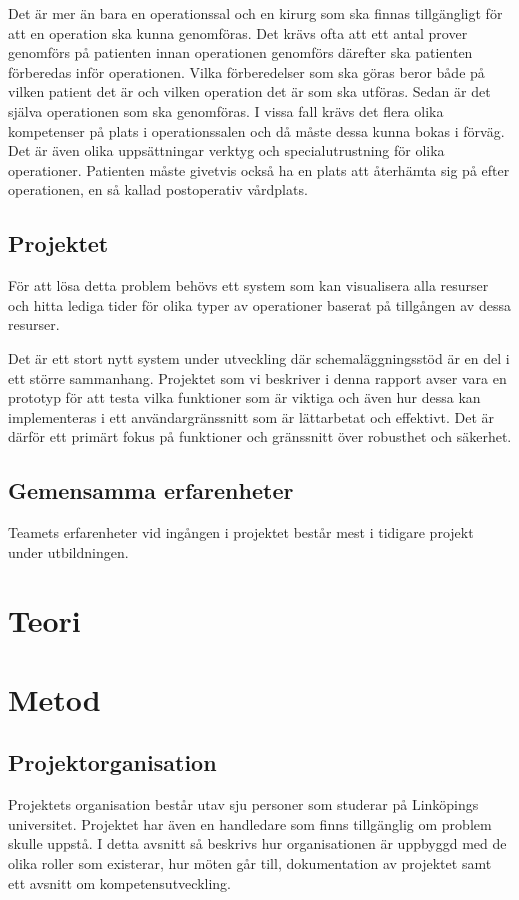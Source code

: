 \documentclass[a4paper,10pt]{article}
\begin{document}
Det är mer än bara en operationssal och en kirurg som ska finnas tillgängligt
för att en operation ska kunna genomföras. Det krävs ofta att ett antal prover
genomförs på patienten innan operationen genomförs därefter ska patienten
förberedas inför operationen. Vilka förberedelser som ska göras beror både på
vilken patient det är och vilken operation det är som ska utföras. Sedan är det
själva operationen som ska genomföras. I vissa fall krävs det flera olika
kompetenser på plats i operationssalen och då måste dessa kunna bokas i förväg.
Det är även olika uppsättningar verktyg och specialutrustning för olika
operationer.
Patienten måste givetvis också ha en plats att återhämta sig på efter
operationen, en så kallad postoperativ vårdplats.

\subsection{Projektet}
För att lösa detta problem behövs ett system som kan visualisera alla resurser
och hitta lediga tider för olika typer av operationer baserat på tillgången av
dessa resurser.

Det är ett stort nytt system under utveckling där schemaläggningsstöd är en del
i ett större sammanhang. Projektet som vi beskriver i denna rapport avser vara
en prototyp för att testa vilka funktioner som är viktiga och även hur dessa
kan implementeras i ett användargränssnitt som är lättarbetat och effektivt.
Det är därför ett primärt fokus på funktioner och gränssnitt över robusthet och
säkerhet.

\subsection{Gemensamma erfarenheter}
Teamets erfarenheter vid ingången i projektet består mest i tidigare projekt
under utbildningen.


\section{Teori}

\section{Metod}

\subsection{Projektorganisation}
Projektets organisation består utav sju personer som studerar på Linköpings universitet. Projektet har även en handledare som finns tillgänglig om problem skulle uppstå. I detta avsnitt så beskrivs hur organisationen är uppbyggd med de olika roller som existerar, hur möten går till, dokumentation av projektet samt ett avsnitt om kompetensutveckling.
\end{document}
